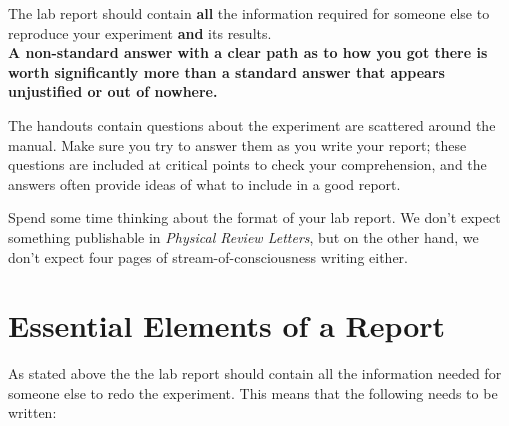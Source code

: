 \begin{imp}
The lab report should contain \textbf{all} the information required for someone else to reproduce your experiment \textbf{and} its results.~\\

\textbf{A non-standard answer with a clear path as to how you got there is worth significantly more than a standard answer that appears unjustified or out of nowhere. }
\end{imp}

The handouts contain questions about the experiment are scattered around the manual. Make sure you try to answer them as you write your report; these questions are included at critical points to check your comprehension, and the answers often provide ideas of what to include in a good report. 

\begin{imp}
Spend some time thinking about the format of your lab report. We don't expect something publishable in \textit{Physical Review Letters}, but on the other hand, we don't expect four pages of stream-of-consciousness writing either.
\end{imp}

\section{Essential Elements of a Report}

As stated above the the lab report should contain all the information needed for someone else to redo the experiment. This means that the following needs to be written:

